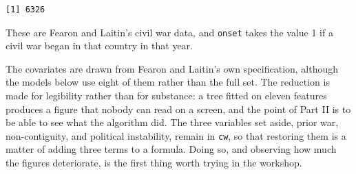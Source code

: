 \documentclass[
  a4paper,
]{scrbook}
\newenvironment{Shaded}{\begin{snugshade}}{\end{snugshade}}
\newcommand{\DecValTok}[1]{\textcolor[rgb]{0.68,0.00,0.00}{#1}}
\newcommand{\FunctionTok}[1]{\textcolor[rgb]{0.28,0.35,0.67}{#1}}
\newcommand{\NormalTok}[1]{\textcolor[rgb]{0.00,0.23,0.31}{#1}}
\newcommand{\OtherTok}[1]{\textcolor[rgb]{0.00,0.23,0.31}{#1}}
\newcommand{\SpecialCharTok}[1]{\textcolor[rgb]{0.37,0.37,0.37}{#1}}
\newcommand{\StringTok}[1]{\textcolor[rgb]{0.13,0.47,0.30}{#1}}
\begin{document}
\begin{Shaded}
\end{Shaded}

\begin{verbatim}
[1] 6326
\end{verbatim}

These are Fearon and Laitin's civil war data, and \texttt{onset} takes
the value 1 if a civil war began in that country in that year.

The covariates are drawn from Fearon and Laitin's own specification,
although the models below use eight of them rather than the full set.
The reduction is made for legibility rather than for substance: a tree
fitted on eleven features produces a figure that nobody can read on a
screen, and the point of Part II is to be able to see what the algorithm
did. The three variables set aside, prior war, non-contiguity, and
political instability, remain in \texttt{cw}, so that restoring them is
a matter of adding three terms to a formula. Doing so, and observing how
much the figures deteriorate, is the first thing worth trying in the
workshop.
\end{document}
